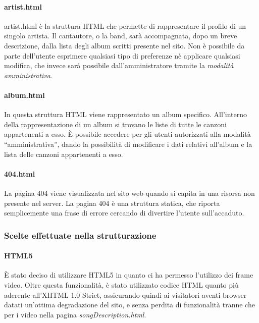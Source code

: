 \paragraph*{artist.html} artist.html è la struttura HTML che permette di rappresentare il profilo di un singolo artista. Il cantautore, o la band, sarà accompagnata, dopo un breve descrizione, dalla lista degli album scritti presente nel sito. Non è possibile da parte dell'utente esprimere qualsiasi tipo di preferenze nè applicare qualsiasi modifica, che invece sarà possibile dall'amministratore tramite la \textit{modalità amministrativa}.

\paragraph*{album.html} In questa struttura HTML viene rappresentato un album specifico. All'interno della rappresentazione di un album si trovano le liste di tutte le canzoni appartenenti a esso. È possibile accedere per gli utenti autorizzati alla modalità ``amministrativa'', dando la possibilità di modificare i dati relativi all'album e la lista delle canzoni appartenenti a esso. %

\paragraph*{404.html} La pagina 404 viene visualizzata nel sito web quando si capita in una risorsa non presente nel server. La pagina 404 è una struttura statica, che riporta semplicemente una frase di errore cercando di divertire l'utente sull'accaduto.


\subsubsection{Scelte effettuate nella strutturazione}
\paragraph{HTML5}
È stato deciso di utilizzare HTML5 in quanto ci ha permesso l'utilizzo dei frame video. Oltre questa funzionalità, è stato utilizzato codice HTML quanto più aderente all'XHTML 1.0 Strict, assicurando quindi ai visitatori aventi browser datati un'ottima degradazione del sito, e senza perdita di funzionalità tranne che per i video nella pagina \textit{songDescription.html}.
